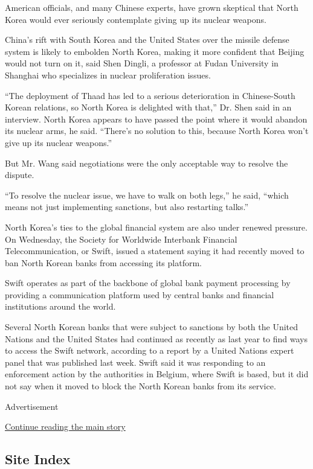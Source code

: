 American officials, and many Chinese experts, have grown skeptical that
North Korea would ever seriously contemplate giving up its nuclear
weapons.

China's rift with South Korea and the United States over the missile
defense system is likely to embolden North Korea, making it more
confident that Beijing would not turn on it, said Shen Dingli, a
professor at Fudan University in Shanghai who specializes in nuclear
proliferation issues.

``The deployment of Thaad has led to a serious deterioration in
Chinese-South Korean relations, so North Korea is delighted with that,''
Dr. Shen said in an interview. North Korea appears to have passed the
point where it would abandon its nuclear arms, he said. ``There's no
solution to this, because North Korea won't give up its nuclear
weapons.''

But Mr. Wang said negotiations were the only acceptable way to resolve
the dispute.

``To resolve the nuclear issue, we have to walk on both legs,'' he said,
``which means not just implementing sanctions, but also restarting
talks.''

North Korea's ties to the global financial system are also under renewed
pressure. On Wednesday, the Society for Worldwide Interbank Financial
Telecommunication, or Swift, issued a statement saying it had recently
moved to ban North Korean banks from accessing its platform.

Swift operates as part of the backbone of global bank payment processing
by providing a communication platform used by central banks and
financial institutions around the world.

Several North Korean banks that were subject to sanctions by both the
United Nations and the United States had continued as recently as last
year to find ways to access the Swift network, according to a report by
a United Nations expert panel that was published last week. Swift said
it was responding to an enforcement action by the authorities in
Belgium, where Swift is based, but it did not say when it moved to block
the North Korean banks from its service.

Advertisement

\protect\hyperlink{after-bottom}{Continue reading the main story}

\hypertarget{site-index}{%
\subsection{Site Index}\label{site-index}}

